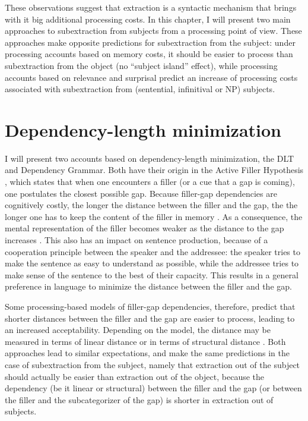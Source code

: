 These observations suggest that extraction is a syntactic mechanism that brings with it big additional processing costs. In this chapter, I will present two main approaches to subextraction from subjects from a processing point of view. These approaches make opposite predictions for subextraction from the subject: under processing accounts based on memory costs, it should be easier to process than subextraction from the object (no ``subject island'' effect), while processing accounts based on relevance and surprisal predict an increase of processing costs associated with subextraction from (sentential, infinitival or NP) subjects.


\section{Dependency-length minimization}
\label{ch:dlt+dg}
\largerpage
I will present two accounts based on dependency-length minimization, the DLT and Dependency Grammar. Both have their origin in the Active Filler Hypothesis \citep{Frazier.1987,Clifton.1989}, which states that when one encounters a filler (or a cue that a gap is coming), one postulates the closest possible gap. Because filler-gap dependencies are cognitively costly, the longer the distance between the filler and the gap, the the longer one has to keep the content of the filler in memory \citep{Fadlon.2019}. As a consequence, the mental representation of the filler becomes weaker as the distance to the gap increases \citep{Lewis.2005}. This also has an impact on sentence production, because of a cooperation principle between the speaker and the addressee: the speaker tries to make the sentence as easy to understand as possible, while the addressee tries to make sense of the sentence to the best of their capacity. This results in a general preference in language to minimize the distance between the filler and the gap. 

Some processing-based models of filler-gap dependencies, therefore, predict that shorter distances between the filler and the gap are easier to process, leading to an increased acceptability. Depending on the model, the distance may be measured in terms of linear distance \citep{Gibson.1998,Gibson.2000} or in terms of structural distance \citep{Rizzi.1990,Hawkins.1999}. Both approaches lead to similar expectations, and make the same predictions in the case of subextraction from the subject, namely that extraction out of the subject should actually be easier than extraction out of the object, because the dependency (be it linear or structural) between the filler and the gap (or between the filler and the subcategorizer of the gap) is shorter in extraction out of subjects.\largerpage

